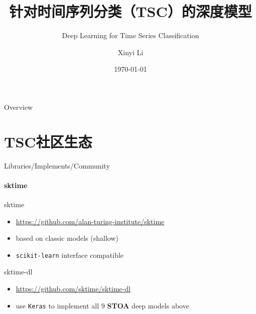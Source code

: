 \documentclass{ctexbeamer}
\title{针对时间序列分类（TSC）的深度模型}
\subtitle{Deep Learning for Time Series Classification \footfullcite{fawaz2019deep}}
\author{Xinyi Li}
\date{\today}
\begin{document}
\begin{frame}
	\titlepage
\end{frame}

\begin{frame}{Overview}
  \tableofcontents
\end{frame}

\section{TSC社区生态}

\begin{frame}{Libraries/Implements/Community}
  \framesubtitle{sktime}
  sktime
  \begin{itemize}
    \item \url{https://github.com/alan-turing-institute/sktime}
    \item based on classic models (shallow)
    \item \texttt{scikit-learn} interface compatible
  \end{itemize}
  sktime-dl
  \begin{itemize}
    \item \url{https://github.com/sktime/sktime-dl}
    \item use \texttt{Keras} to implement all 9 \textbf{STOA} deep models above
    \color{red}{\item 暂时不能直接安装（MacOS）}
  \end{itemize}
\end{frame}
\end{document}
